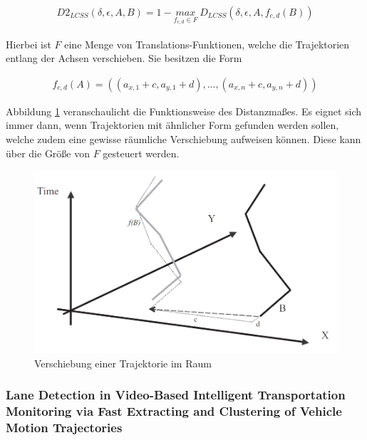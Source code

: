 \begin{ceqn}
\begin{align}
    D2_{LCSS}(\delta, \epsilon, A, B) = 1 - \underset{f_{c,d} \in F}{max}\ D_{LCSS}(\delta, \epsilon, A, f_{c,d}(B))
\end{align}
\end{ceqn}

Hierbei ist $F$ eine Menge von Translations-Funktionen, welche die Trajektorien entlang der Achsen verschieben.
Sie besitzen die Form

\begin{ceqn}
\begin{align}
    f_{c, d}(A) = ((a_{x, 1} + c, a_{y, 1} + d), ..., (a_{x, n} + c, a_{y, n} + d))
\end{align}
\end{ceqn}

Abbildung \ref{fig:relw_vlachos_translation} veranschaulicht die Funktionsweise des Distanzmaßes. Es eignet sich immer dann, wenn Trajektorien
mit ähnlicher Form gefunden werden sollen, welche zudem eine gewisse räumliche Verschiebung aufweisen können.
Diese kann über die Größe von $F$ gesteuert werden.

\begin{figure}[H]
    \centering
    \includegraphics[width=0.55\linewidth]{resources/img/RelatedWork/vlachos_translation}
    \caption[Verschiebung einer Trajektorie im Raum]{Verschiebung einer Trajektorie im Raum \cite[]{Vlachos2002}}
    \label{fig:relw_vlachos_translation}
\end{figure}

\subsubsection*{Lane Detection in Video-Based Intelligent Transportation Monitoring via Fast Extracting and Clustering of Vehicle Motion Trajectories}

